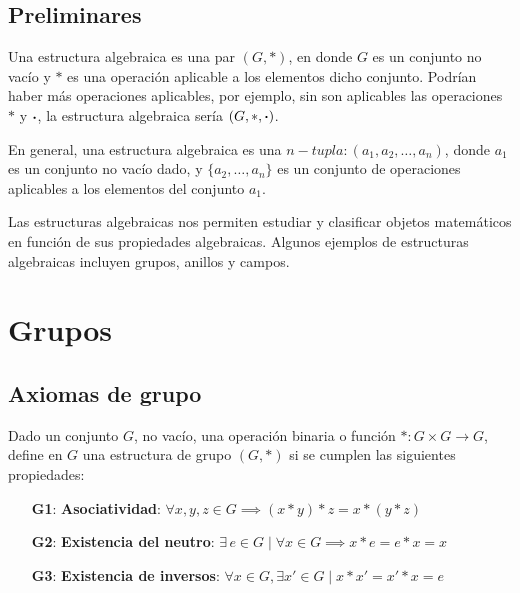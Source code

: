 \subsection{Preliminares}

Una estructura algebraica es una par $(G, *)$, en donde $G$ es un conjunto no vacío y $*$ es una operación aplicable a los elementos dicho conjunto. Podrían haber más operaciones aplicables, por ejemplo, sin son aplicables las operaciones $*$ y $\boldsymbol{\cdot}$, la estructura algebraica sería $(G, *, \boldsymbol{\cdot})$.

En general, una estructura algebraica es una $n-tupla: (a_1, a_2, \dots, a_n)$, donde $a_1$ es un conjunto no vacío dado, y $\{ a_2, \dots, a_n \}$ es un conjunto de operaciones aplicables a los elementos del conjunto $a_1$.

Las estructuras algebraicas nos permiten estudiar y clasificar objetos matemáticos en función de sus propiedades algebraicas. Algunos ejemplos de estructuras algebraicas incluyen grupos, anillos y campos.

\section{Grupos}
\subsection{Axiomas de grupo} \label{sec:axiomas-grupo} 
\vspace{2mm}
\begin{fmd-definition}[Grupo] 
	Dado un conjunto $G$, no vacío, una operación binaria o función $*: G \times G \rightarrow G$, define en $G$ una estructura de \gls{grupo} $(G, *)$ si se cumplen las siguientes propiedades:
	\begin{enumerate}
		\item[\textbf{G1}:] \textbf{Asociatividad}: $\forall x, y, z \in G \implies (x*y)*z = x * (y*z)$
		\item[\textbf{G2}:] \textbf{Existencia del neutro}: $\exists \, e \in G \mid \forall x \in G \implies x*e = e*x = x$  
		\item[\textbf{G3}:] \textbf{Existencia de inversos}: $\forall x \in G, \exists x' \in G \mid x * x' = x'*x = e$  
	\end{enumerate}
\end{fmd-definition}

